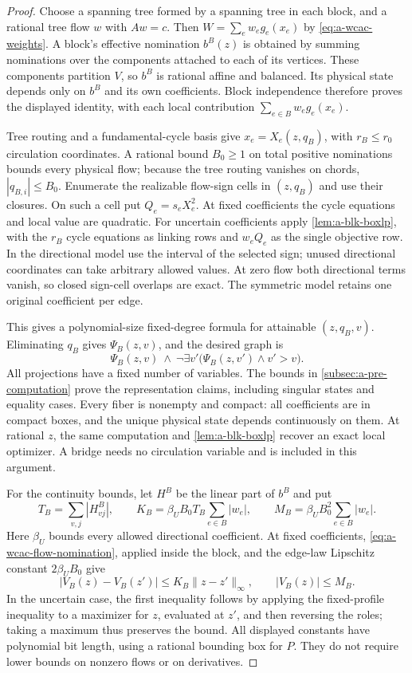 \begin{proof}
Choose a spanning tree formed by a spanning tree in each block, and a
rational tree flow $w$ with $Aw=c$. Then
$W=\sum_e w_eg_e(x_e)$ by \eqref{eq:a-wcac-weights}. A block's effective
nomination $b^B(z)$ is obtained by summing nominations over the components
attached to each of its vertices. These components partition $V$, so
$b^B$ is rational affine and balanced. Its physical state depends only
on $b^B$ and its own coefficients. Block independence therefore proves
the displayed identity, with each local contribution
$\sum_{e\in B}w_eg_e(x_e)$.

Tree routing and a fundamental-cycle basis give
$x_e=X_e(z,q_B)$, with $r_B\le r_0$ circulation coordinates. A rational
bound $B_0\ge1$ on total positive nominations bounds every physical flow;
because the tree routing vanishes on chords, $|q_{B,i}|\le B_0$.
Enumerate the realizable flow-sign cells in $(z,q_B)$ and use their
closures. On such a cell put $Q_e=s_eX_e^2$. At fixed coefficients the
cycle equations and local value are quadratic. For uncertain coefficients
apply \cref{lem:a-blk-boxlp}, with the $r_B$ cycle equations as linking
rows and $w_eQ_e$ as the single objective row. In the directional model
use the interval of the selected sign; unused directional coordinates
can take arbitrary allowed values. At zero flow both directional terms
vanish, so closed sign-cell overlaps are exact. The symmetric model
retains one original coefficient per edge.

This gives a polynomial-size fixed-degree formula for attainable
$(z,q_B,v)$. Eliminating $q_B$ gives $\Psi_B(z,v)$, and the desired graph is
\[
 \Psi_B(z,v)\ \wedge\
 \neg\exists v'\bigl(\Psi_B(z,v')\wedge v'>v\bigr).
\]
All projections have a fixed number of variables. The bounds in
\cref{subsec:a-pre-computation} prove the representation claims, including
singular states and equality cases. Every fiber is nonempty and compact:
all coefficients are in compact boxes, and the unique physical state
depends continuously on them. At rational $z$, the same computation and
\cref{lem:a-blk-boxlp} recover an exact local optimizer. A bridge needs no
circulation variable and is included in this argument.

For the continuity bounds, let $H^B$ be the linear part of $b^B$ and put
\[
 T_B=\sum_{v,j}|H^B_{vj}|,\qquad
 K_B=\beta_U B_0T_B\sum_{e\in B}|w_e|,\qquad
 M_B=\beta_U B_0^2\sum_{e\in B}|w_e|.
\]
Here $\beta_U$ bounds every allowed directional coefficient. At fixed
coefficients, \eqref{eq:a-wcac-flow-nomination}, applied inside the block,
and the edge-law Lipschitz constant $2\beta_U B_0$ give
\[
 |V_B(z)-V_B(z')|\le K_B\|z-z'\|_\infty,
 \qquad |V_B(z)|\le M_B.
\]
In the uncertain case, the first inequality follows by applying the
fixed-profile inequality to a maximizer for $z$, evaluated at $z'$, and
then reversing the roles; taking a maximum thus preserves the bound.
All displayed constants have polynomial bit length, using a rational
bounding box for $P$. They do not require lower bounds on nonzero flows
or on derivatives.
\end{proof}

